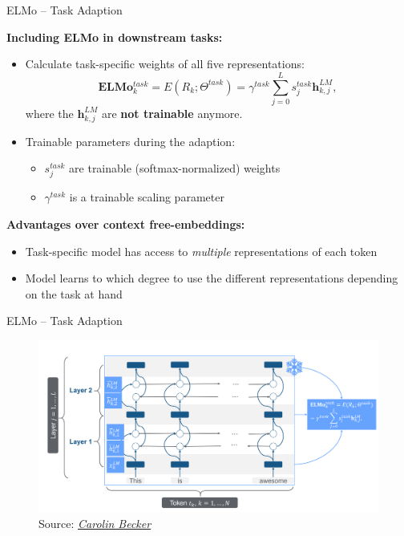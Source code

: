 \documentclass[]{beamer}
\begin{document}
\begin{frame}{ELMo -- Task Adaption}

	\textbf{Including ELMo in downstream tasks:}

	\begin{itemize}
		\item Calculate task-specific weights of all five representations:
					$$\mathbf{E} \mathbf{L} \mathbf{M} \mathbf{o}_{k}^{t a s k}=E\left(R_{k} ; \Theta^{t a s k}\right)=\gamma^{t a s k} \sum_{j=0}^{L} s_{j}^{t a s k} \mathbf{h}_{k, j}^{L M},$$
					where the $\mathbf{h}_{k, j}^{L M}$ are \textbf{not trainable} anymore.
		\item Trainable parameters during the adaption:
			\begin{itemize}
				\item $s_{j}^{t a s k}$ are trainable (softmax-normalized) weights
				\item $\gamma^{t a s k}$ is a trainable scaling parameter
			\end{itemize}
	\end{itemize}

	\textbf{Advantages over context free-embeddings:}

	\begin{itemize}
		\item Task-specific model has access to \textit{multiple} representations of each token
		\item Model learns to which degree to use the different representations depending on the task at hand
	\end{itemize}
\end{frame}



\begin{frame}{ELMo -- Task Adaption}
	\begin{figure}
		\centering
		\includegraphics[width = 12cm]{figure/elmo-adaption}\\ 
		\footnotesize{Source:} \href{https://compstat-lmu.github.io/seminar_nlp_ss20/transfer-learning-for-nlp-i.html}{\footnotesize \it Carolin Becker}
	\end{figure}
\end{frame}
\end{document}
